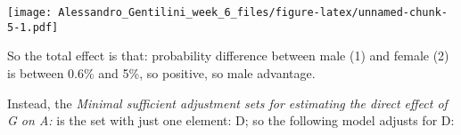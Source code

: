 \documentclass[]{article}
\newenvironment{Shaded}{\begin{snugshade}}{\end{snugshade}}
\newcommand{\KeywordTok}[1]{\textcolor[rgb]{0.13,0.29,0.53}{\textbf{{#1}}}}
\newcommand{\DataTypeTok}[1]{\textcolor[rgb]{0.13,0.29,0.53}{{#1}}}
\newcommand{\DecValTok}[1]{\textcolor[rgb]{0.00,0.00,0.81}{{#1}}}
\newcommand{\FloatTok}[1]{\textcolor[rgb]{0.00,0.00,0.81}{{#1}}}
\newcommand{\StringTok}[1]{\textcolor[rgb]{0.31,0.60,0.02}{{#1}}}
\newcommand{\NormalTok}[1]{{#1}}
\begin{document}
\texttt{[image: Alessandro\_Gentilini\_week\_6\_files/figure-latex/unnamed-chunk-5-1.pdf]}

So the total effect is that: probability difference between male (1) and
female (2) is between 0.6\% and 5\%, so positive, so male advantage.

Instead, the \emph{Minimal sufficient adjustment sets for estimating the
direct effect of G on A:} is the set with just one element: D; so the
following model adjusts for D:

\begin{Shaded}
\end{Shaded}
\end{document}
